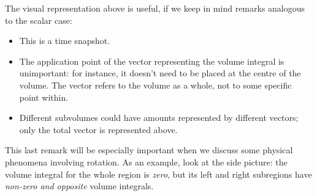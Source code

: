 \documentclass[a4paper,12pt,%
onecolumn,oneside,titlepage,%
british%
]{memoir}
\renewcommand*{\|}[1][]{\nonscript\:#1\vert\nonscript\:\mathopen{}}
\newcommand*{\fig}{fig.}%
\begin{document}
The visual representation above is useful, if we keep in mind remarks analogous to the scalar case:
\begin{itemize}
\item This is a time snapshot.
\item\label{item:applicationpoint}The application point of the vector representing the volume integral is unimportant: for instance, it doesn't need to be placed at the centre of the volume. The vector refers to the volume as a whole, not to some specific point within.
\item Different subvolumes could have amounts represented by different vectors; only the total vector is represented above.
\end{itemize}
This last remark will be especially important when we discuss some physical phenomena involving rotation. As an example, look at the side picture:%
the volume integral for the whole region is \emph{zero}, but its left and right subregions have \emph{non-zero and opposite} volume integrals.
\end{document}
